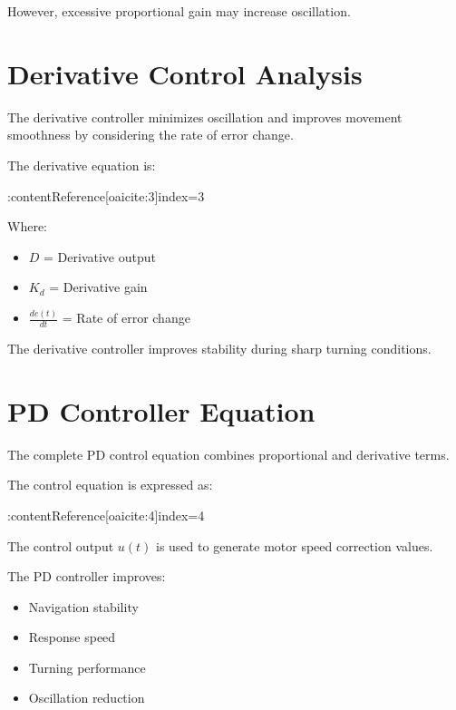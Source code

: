 \documentclass[12pt,a4paper,oneside]{report}
\begin{document}
However, excessive proportional gain may increase oscillation.


\section{Derivative Control Analysis}

The derivative controller minimizes oscillation and improves movement smoothness by considering the rate of error change.

The derivative equation is:

:contentReference[oaicite:3]{index=3}

Where:

\begin{itemize}

\item \(D\) = Derivative output

\item \(K_d\) = Derivative gain

\item \(\frac{de(t)}{dt}\) = Rate of error change

\end{itemize}

The derivative controller improves stability during sharp turning conditions.


\section{PD Controller Equation}

The complete PD control equation combines proportional and derivative terms.

The control equation is expressed as:

:contentReference[oaicite:4]{index=4}

The control output \(u(t)\) is used to generate motor speed correction values.

The PD controller improves:

\begin{itemize}

\item Navigation stability

\item Response speed

\item Turning performance

\item Oscillation reduction

\end{itemize}
\end{document}
